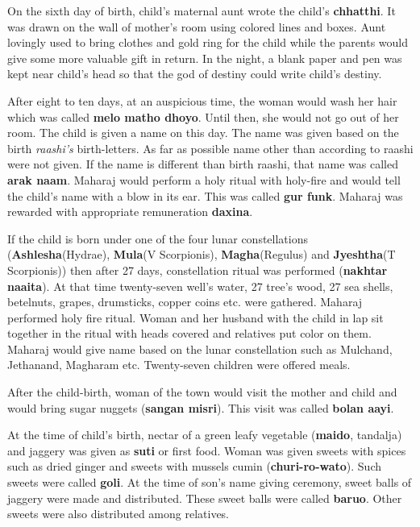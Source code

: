 On the sixth day of birth, child's maternal aunt wrote the child's
\textbf{chhatthi}. It was drawn on the wall of mother's room using colored
lines and boxes. Aunt lovingly used to bring clothes and gold ring for the
child while the parents would give some more valuable gift in return. In the
night, a blank paper and pen was kept near child's head so that the god of
destiny could write child's destiny.

After eight to ten days, at an auspicious time, the woman would wash her hair
which was called \textbf{melo matho dhoyo}. Until then, she would not go out of
her room. The child is given a name on this day. The name was given based on
the birth \textit{raashi's} birth-letters. As far as possible name other than
according to raashi were not given. If the name is different than birth raashi,
that name was called \textbf{arak naam}. Maharaj would perform a holy ritual
with holy-fire and would tell the child's name with a blow in its ear. This was
called \textbf{gur funk}. Maharaj was rewarded with appropriate remuneration
\textbf{daxina}.

If the child is born under one of the four lunar constellations
(\textbf{Ashlesha}(Hydrae), \textbf{Mula}(V Scorpionis),
\textbf{Magha}(Regulus) and \textbf{Jyeshtha}(T Scorpionis)) then after 27
days, constellation ritual was performed (\textbf{nakhtar naaita}). At that
time twenty-seven well's water, 27 tree's wood, 27 sea shells, betelnuts,
grapes, drumsticks, copper coins etc. were gathered. Maharaj performed holy
fire ritual. Woman and her husband with the child in lap sit together in the
ritual with heads covered and relatives put color on them. Maharaj would give
name based on the lunar constellation such as Mulchand, Jethanand, Magharam
etc. Twenty-seven children were offered meals.

After the child-birth, woman of the town would visit the mother and child and
would bring sugar nuggets (\textbf{sangan misri}). This visit was called
\textbf{bolan aayi}.

At the time of child's birth, nectar of a green leafy vegetable
(\textbf{maido}, tandalja) and jaggery was given as \textbf{suti} or first
food. Woman was given sweets with spices such as dried ginger and sweets with
mussels cumin (\textbf{churi-ro-wato}). Such sweets were called \textbf{goli}.
At the time of son's name giving ceremony, sweet balls of jaggery were made and
distributed. These sweet balls were called \textbf{baruo}. Other sweets were
also distributed among relatives.

